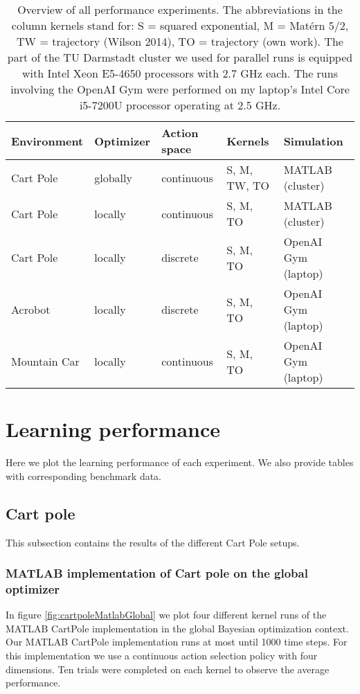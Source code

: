 \begin{table}[h]
    \centering
    \begin{tabular}{|l|l|l|l|l|}\hline
        Environment & Optimizer & Action space & Kernels & Simulation\\\hline
        Cart Pole & globally & continuous & S, M, TW, TO & MATLAB (cluster)\\\hline
        Cart Pole & locally & continuous & S, M, TO & MATLAB (cluster)\\\hline
        Cart Pole & locally & discrete & S, M, TO & OpenAI Gym (laptop)\\\hline
        Acrobot & locally & discrete & S, M, TO & OpenAI Gym (laptop)\\\hline
        Mountain Car & locally & continuous & S, M, TO & OpenAI Gym (laptop)\\\hline
    \end{tabular}
    \caption{Overview of all performance experiments. The abbreviations in the column kernels stand for: S = squared exponential, M = Matérn 5/2, TW = trajectory (Wilson 2014), TO = trajectory (own work). The part of the TU Darmstadt cluster we used for parallel runs is equipped with Intel Xeon E5-4650 processors with 2.7 GHz each. The runs involving the OpenAI Gym were performed on my laptop's Intel Core i5-7200U processor operating at 2.5 GHz.\label{table:xps}}
\end{table}

\newpage
\section{Learning performance}

Here we plot the learning performance of each experiment. We also provide tables with corresponding benchmark data.

\subsection{Cart pole}
This subsection contains the results of the different Cart Pole setups.

\subsubsection{MATLAB implementation of Cart pole on the global optimizer}

In figure \ref{fig:cartpoleMatlabGlobal} we plot four different kernel runs of the MATLAB CartPole implementation in the global Bayesian optimization context. Our MATLAB CartPole implementation runs at most until 1000 time steps. For this implementation we use a continuous action selection policy with four dimensions. Ten trials were completed on each kernel to observe the average performance.

